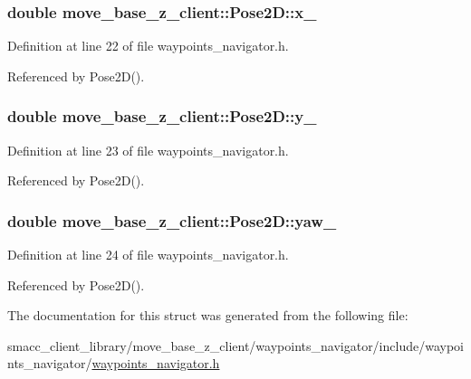 \subsubsection[{\texorpdfstring{x\+\_\+}{x_}}]{\setlength{\rightskip}{0pt plus 5cm}double move\+\_\+base\+\_\+z\+\_\+client\+::\+Pose2\+D\+::x\+\_\+}\hypertarget{structmove__base__z__client_1_1Pose2D_a92b53110c2fdd77c18275d6e16709581}{}\label{structmove__base__z__client_1_1Pose2D_a92b53110c2fdd77c18275d6e16709581}


Definition at line 22 of file waypoints\+\_\+navigator.\+h.



Referenced by Pose2\+D().

\subsubsection[{\texorpdfstring{y\+\_\+}{y_}}]{\setlength{\rightskip}{0pt plus 5cm}double move\+\_\+base\+\_\+z\+\_\+client\+::\+Pose2\+D\+::y\+\_\+}\hypertarget{structmove__base__z__client_1_1Pose2D_a10e59f372c758bffb00bfaaca43ec1fc}{}\label{structmove__base__z__client_1_1Pose2D_a10e59f372c758bffb00bfaaca43ec1fc}


Definition at line 23 of file waypoints\+\_\+navigator.\+h.



Referenced by Pose2\+D().

\subsubsection[{\texorpdfstring{yaw\+\_\+}{yaw_}}]{\setlength{\rightskip}{0pt plus 5cm}double move\+\_\+base\+\_\+z\+\_\+client\+::\+Pose2\+D\+::yaw\+\_\+}\hypertarget{structmove__base__z__client_1_1Pose2D_a75fda2f20515d0acdb83d33017e6c97e}{}\label{structmove__base__z__client_1_1Pose2D_a75fda2f20515d0acdb83d33017e6c97e}


Definition at line 24 of file waypoints\+\_\+navigator.\+h.



Referenced by Pose2\+D().



The documentation for this struct was generated from the following file\+:\begin{DoxyCompactItemize}
\item 
smacc\+\_\+client\+\_\+library/move\+\_\+base\+\_\+z\+\_\+client/waypoints\+\_\+navigator/include/waypoints\+\_\+navigator/\hyperlink{waypoints__navigator_8h}{waypoints\+\_\+navigator.\+h}\end{DoxyCompactItemize}
